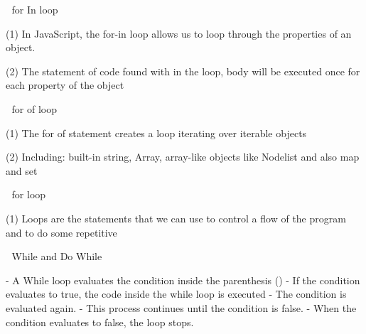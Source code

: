 🚀 for In loop

(1) In JavaScript, the for-in loop allows us to loop through the properties of an object.

(2) The statement of code found with in the loop, body will be executed once for each property of the object


🚀 for of loop

(1) The for of statement creates a loop iterating over iterable objects

(2) Including: built-in string, Array, array-like objects like Nodelist and also map and set


🚀 for loop

(1) Loops are the statements that we can use to control  a flow of the program and to do some repetitive

🚀 While and Do While

- A While loop evaluates the condition inside the parenthesis ()
- If the condition evaluates to true, the code inside the while loop is executed
- The condition is evaluated again.
- This process continues until the condition is false.
- When the condition evaluates to false, the loop stops.

